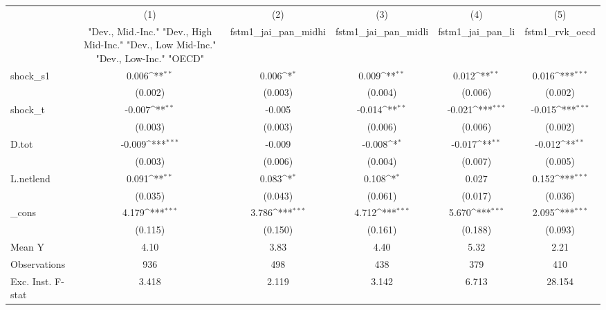 {
\def\sym#1{\ifmmode^{#1}\else\(^{#1}\)\fi}
\begin{tabular}{l*{5}{c}}
\toprule
            &\multicolumn{1}{c}{(1)}&\multicolumn{1}{c}{(2)}&\multicolumn{1}{c}{(3)}&\multicolumn{1}{c}{(4)}&\multicolumn{1}{c}{(5)}\\
            &\multicolumn{1}{c}{ "Dev., Mid.-Inc." "Dev., High Mid-Inc." "Dev., Low Mid-Inc." "Dev., Low-Inc." "OECD" }&\multicolumn{1}{c}{fstm1\_jai\_pan\_midhi}&\multicolumn{1}{c}{fstm1\_jai\_pan\_midli}&\multicolumn{1}{c}{fstm1\_jai\_pan\_li}&\multicolumn{1}{c}{fstm1\_rvk\_oecd}\\
\midrule
shock\_s1    &       0.006\sym{**} &       0.006\sym{*}  &       0.009\sym{**} &       0.012\sym{**} &       0.016\sym{***}\\
            &     (0.002)         &     (0.003)         &     (0.004)         &     (0.006)         &     (0.002)         \\
\addlinespace
shock\_t     &      -0.007\sym{**} &      -0.005         &      -0.014\sym{**} &      -0.021\sym{***}&      -0.015\sym{***}\\
            &     (0.003)         &     (0.003)         &     (0.006)         &     (0.006)         &     (0.002)         \\
\addlinespace
D.tot       &      -0.009\sym{***}&      -0.009         &      -0.008\sym{*}  &      -0.017\sym{**} &      -0.012\sym{**} \\
            &     (0.003)         &     (0.006)         &     (0.004)         &     (0.007)         &     (0.005)         \\
\addlinespace
L.netlend   &       0.091\sym{**} &       0.083\sym{*}  &       0.108\sym{*}  &       0.027         &       0.152\sym{***}\\
            &     (0.035)         &     (0.043)         &     (0.061)         &     (0.017)         &     (0.036)         \\
\addlinespace
\_cons      &       4.179\sym{***}&       3.786\sym{***}&       4.712\sym{***}&       5.670\sym{***}&       2.095\sym{***}\\
            &     (0.115)         &     (0.150)         &     (0.161)         &     (0.188)         &     (0.093)         \\
\midrule
Mean Y      &        4.10         &        3.83         &        4.40         &        5.32         &        2.21         \\
Observations&         936         &         498         &         438         &         379         &         410         \\
Exc. Inst. F-stat&       3.418         &       2.119         &       3.142         &       6.713         &      28.154         \\
\bottomrule
\end{tabular}
}
